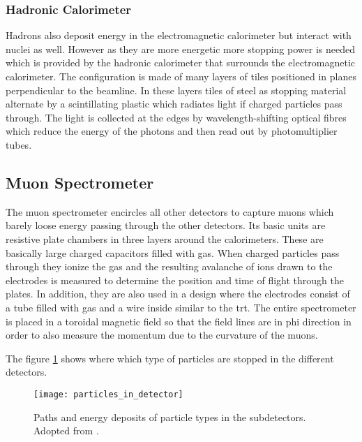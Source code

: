 \subsubsection*{Hadronic Calorimeter}

Hadrons also deposit energy in the electromagnetic calorimeter but interact with nuclei as well. However as they are more energetic more stopping power is needed which is provided by the hadronic calorimeter that surrounds the electromagnetic calorimeter. The configuration is made of many layers of tiles positioned in planes perpendicular to the beamline. In these layers tiles of steel as stopping material alternate by a scintillating plastic which radiates light if charged particles pass through. The light is collected at the edges by wavelength-shifting optical fibres  which reduce the energy of the photons and then read out by photomultiplier tubes.

\subsection*{Muon Spectrometer}

The muon spectrometer encircles all other detectors to capture muons which barely loose energy passing through the other detectors. Its basic units are resistive plate chambers in three layers around the calorimeters. These are basically large charged capacitors filled with gas. When charged particles pass through they ionize the gas and the resulting avalanche of ions drawn to the electrodes is measured to determine the position and time of flight through the plates.  In addition, they are also used in a design where the electrodes consist of a tube filled with gas and a wire inside similar to the \ac{trt}. The entire spectrometer is placed in a toroidal magnetic field so that the field lines are in phi direction in order to also measure the momentum due to the curvature of the muons.

The figure \ref{fig:particles_in_detector} shows where which type of particles are stopped in the different detectors.
\begin{figure}
    \centering
    \texttt{[image: particles\_in\_detector]}
        \caption[]{Paths and energy deposits of particle types in the subdetectors. Adopted from \citep{Pequenao:1505342}.}
    \label{fig:particles_in_detector}    
\end{figure}